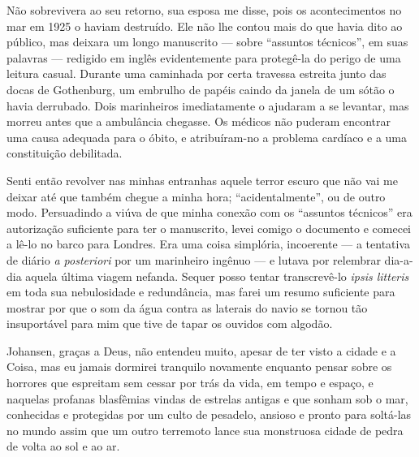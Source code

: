 \begin{pages}
\begin{Rightside}
Não sobrevivera ao seu retorno, sua esposa me disse, pois os
acontecimentos no mar em 1925 o haviam destruído. Ele não lhe contou
mais do que havia dito ao público, mas deixara um longo manuscrito ---
sobre ``assuntos técnicos'', em suas palavras --- redigido em inglês
evidentemente para protegê-la do perigo de uma leitura casual. Durante
uma caminhada por certa travessa estreita junto das docas de Gothenburg,
um embrulho de papéis caindo da janela de um sótão o havia derrubado.
Dois marinheiros 
imediatamente o ajudaram a se levantar, mas morreu antes que a
ambulância chegasse. Os médicos não puderam encontrar uma causa adequada
para o óbito, e atribuíram-no a problema cardíaco e a uma constituição
debilitada.

Senti então revolver nas minhas entranhas aquele terror escuro que não
vai me deixar até que também chegue a minha hora; ``acidentalmente'', ou
de outro modo. Persuadindo a viúva de que minha conexão com os
``assuntos técnicos'' era autorização suficiente para ter o manuscrito,
levei comigo o documento e comecei a lê-lo no barco para Londres. Era
uma coisa simplória, incoerente --- a tentativa de diário \emph{a
posteriori} por um marinheiro ingênuo --- e lutava por relembrar
dia-a-dia aquela última viagem nefanda. Sequer posso tentar
transcrevê-lo \emph{ipsis litteris} em toda sua nebulosidade e
redundância, mas farei um resumo suficiente para mostrar por que o som
da água contra as laterais do navio se tornou tão insuportável para mim
que tive de tapar os ouvidos com algodão.

Johansen, graças a Deus, não entendeu muito, apesar de ter visto a
cidade e a Coisa, mas eu jamais dormirei tranquilo novamente enquanto
pensar sobre os horrores que espreitam sem cessar por trás da vida, em
tempo e espaço, e naquelas profanas blasfêmias vindas de estrelas
antigas e que sonham sob o mar, conhecidas e protegidas por um culto de
pesadelo, ansioso e pronto para soltá-las no mundo assim que um outro
terremoto lance sua monstruosa cidade de pedra de volta ao sol e ao ar.


\end{Rightside}
\end{pages}
